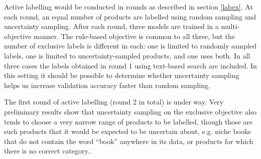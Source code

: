 Active labelling would be conducted in rounds as described in section \ref{labex}.
At each round, an equal number of products are labelled using random sampling and uncertainty sampling.
After each round, three models are trained in a multi-objective manner.
The rule-based objective is common to all three, but the number of exclusive labels is different in each: one is limited to randomly sampled labels, one is limited to uncertainty-sampled products, and one uses both.
In all three cases the labels obtained in round 1 using text-based search are included.
In this setting it should be possible to determine whether uncertainty sampling helps us increase validation accuracy faster than random sampling.

The first round of active labelling (round 2 in total) is under way.
Very preliminary results show that uncertainty sampling on the exclusive objective also tends to choose a very narrow range of products to be labelled, though those are such products that it would be expected to be uncertain about, e.g. niche books that do not contain the word ``book'' anywhere in its data, or products for which there is no correct category..
